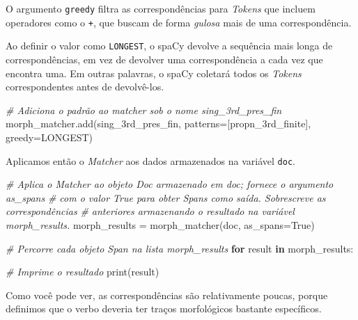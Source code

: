 \documentclass[
  brazilian,
]{article}
\newenvironment{Shaded}{}{}
\newcommand{\BuiltInTok}[1]{#1}
\newcommand{\CommentTok}[1]{\textcolor[rgb]{0.38,0.63,0.69}{\textit{#1}}}
\newcommand{\ControlFlowTok}[1]{\textcolor[rgb]{0.00,0.44,0.13}{\textbf{#1}}}
\newcommand{\KeywordTok}[1]{\textcolor[rgb]{0.00,0.44,0.13}{\textbf{#1}}}
\newcommand{\NormalTok}[1]{#1}
\newcommand{\OperatorTok}[1]{\textcolor[rgb]{0.40,0.40,0.40}{#1}}
\newcommand{\StringTok}[1]{\textcolor[rgb]{0.25,0.44,0.63}{#1}}
\newcommand{\VariableTok}[1]{\textcolor[rgb]{0.10,0.09,0.49}{#1}}
\begin{document}
O argumento \texttt{greedy} filtra as correspondências para
\emph{Tokens} que incluem operadores como o \texttt{+}, que buscam de
forma \emph{gulosa} mais de uma correspondência.

Ao definir o valor como \texttt{LONGEST}, o spaCy devolve a sequência
mais longa de correspondências, em vez de devolver uma correspondência a
cada vez que encontra uma. Em outras palavras, o spaCy coletará todos os
\emph{Tokens} correspondentes antes de devolvê-los.

\begin{Shaded}
\begin{Highlighting}[]
\CommentTok{\# Adiciona o padrão ao matcher sob o nome \textquotesingle{}sing\_3rd\_pres\_fin\textquotesingle{}}
\NormalTok{morph\_matcher.add(}\StringTok{\textquotesingle{}sing\_3rd\_pres\_fin\textquotesingle{}}\NormalTok{, patterns}\OperatorTok{=}\NormalTok{[propn\_3rd\_finite], greedy}\OperatorTok{=}\StringTok{\textquotesingle{}LONGEST\textquotesingle{}}\NormalTok{)}
\end{Highlighting}
\end{Shaded}

Aplicamos então o \emph{Matcher} aos dados armazenados na variável
\texttt{doc}.

\begin{Shaded}
\begin{Highlighting}[]
\CommentTok{\# Aplica o Matcher ao objeto Doc armazenado em \textquotesingle{}doc\textquotesingle{}; fornece o argumento \textquotesingle{}as\_spans\textquotesingle{}}
\CommentTok{\# com o valor True para obter Spans como saída. Sobrescreve as correspondências}
\CommentTok{\# anteriores armazenando o resultado na variável \textquotesingle{}morph\_results\textquotesingle{}.}
\NormalTok{morph\_results }\OperatorTok{=}\NormalTok{ morph\_matcher(doc, as\_spans}\OperatorTok{=}\VariableTok{True}\NormalTok{)}

\CommentTok{\# Percorre cada objeto Span na lista \textquotesingle{}morph\_results\textquotesingle{}}
\ControlFlowTok{for}\NormalTok{ result }\KeywordTok{in}\NormalTok{ morph\_results:}

    \CommentTok{\# Imprime o resultado}
    \BuiltInTok{print}\NormalTok{(result)}
\end{Highlighting}
\end{Shaded}

Como você pode ver, as correspondências são relativamente poucas, porque
definimos que o verbo deveria ter traços morfológicos bastante
específicos.
\end{document}
